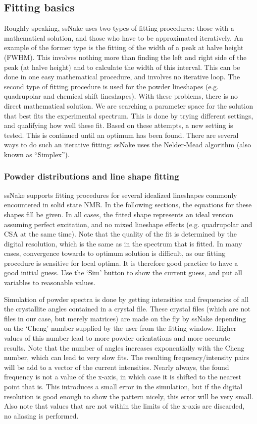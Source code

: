 \documentclass[11pt,a4paper]{article}
\begin{document}
\subsection{Fitting basics}
Roughly speaking, ssNake uses two types of fitting procedures: those with a mathematical solution, and those who have to be approximated iteratively. An example of the former type is the fitting of the width of a peak at halve height (FWHM). This involves nothing more than finding the left and right side of the peak (at halve height) and to calculate the width of this interval. This can be done in one easy mathematical procedure, and involves no iterative loop. The second type of fitting procedure is used for the powder lineshapes (e.g. quadrupolar and chemical shift lineshapes). With these problems, there is no direct mathematical solution. We are searching a parameter space for the solution that best fits the experimental spectrum. This is done by trying different settings, and qualifying how well these fit. Based on these attempts, a new setting is tested. This is continued until an optimum has been found. There are several ways to do such an iterative fitting: ssNake uses the Nelder-Mead algorithm \cite{nelder1965simplex} (also known as ``Simplex'').

\subsubsection*{Powder distributions and line shape fitting}
ssNake supports fitting procedures for several idealized lineshapes commonly encountered in solid state NMR. In the following sections, the equations for these shapes fill be given. In all cases, the fitted shape represents an ideal version assuming perfect excitation, and no mixed lineshape effects (e.g. quadrupolar and CSA at the same time). Note that the quality of the fit is determined by the digital resolution, which is the same as in the spectrum that is fitted. In many cases, convergence towards to optimum solution is difficult, as our fitting procedure is sensitive for local optima. It is therefore good practice to have a good initial guess. Use the `Sim' button to show the current guess, and put all variables to reasonable values.

Simulation of powder spectra is done by getting intensities and frequencies of all the crystallite angles contained in a crystal file. These crystal files (which are not files in our case, but merely matrices) are made on the fly by ssNake depending on the `Cheng' number supplied by the user from the fitting window. Higher values of this number lead to more powder orientations and more accurate results. Note that the number of angles increases exponentially with the Cheng number, which can lead to very slow fits. The resulting frequency/intensity pairs will be add to a vector of the current intensities. Nearly always, the found frequency is not a value of the x-axis, in which case it is shifted to the nearest point that is. This introduces a small error in the simulation, but if the digital resolution is good enough to show the pattern nicely, this error will be very small. Also note that values that are not within the limits of the x-axis are discarded, no aliasing is performed.
\end{document}
